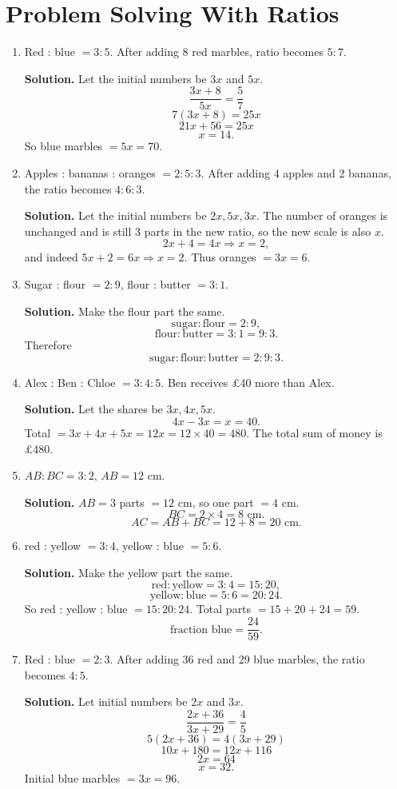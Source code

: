 \documentclass[12pt,a4paper]{article}
\begin{document}
\section*{Problem Solving With Ratios}
\begin{enumerate}
\item Red : blue \(=3:5\). After adding 8 red marbles, ratio becomes \(5:7\).

\textbf{Solution.} Let the initial numbers be \(3x\) and \(5x\).
\[
\frac{3x+8}{5x}=\frac{5}{7}
\]
\[
7(3x+8)=25x
\]
\[
21x+56=25x
\]
\[
x=14.
\]
So blue marbles \(=5x=70\).

\item Apples : bananas : oranges \(=2:5:3\). After adding 4 apples and 2 bananas, the ratio becomes \(4:6:3\).

\textbf{Solution.} Let the initial numbers be \(2x,5x,3x\). The number of oranges is unchanged and is still 3 parts in the new ratio, so the new scale is also \(x\).
\[
2x+4=4x \Rightarrow x=2,
\]
and indeed \(5x+2=6x\Rightarrow x=2\). Thus oranges \(=3x=6\).

\item Sugar : flour \(=2:9\), flour : butter \(=3:1\).

\textbf{Solution.} Make the flour part the same.
\[
\text{sugar}:\text{flour}=2:9,
\]
\[
\text{flour}:\text{butter}=3:1=9:3.
\]
Therefore
\[
\text{sugar}:\text{flour}:\text{butter}=2:9:3.
\]

\item Alex : Ben : Chloe \(=3:4:5\). Ben receives \pounds40 more than Alex.

\textbf{Solution.} Let the shares be \(3x,4x,5x\).
\[
4x-3x=x=40.
\]
Total \(=3x+4x+5x=12x=12\times40=480\).
The total sum of money is \pounds480.

\item \(AB:BC=3:2\), \(AB=12\) cm.

\textbf{Solution.} \(AB=3\) parts \(=12\) cm, so one part \(=4\) cm.
\[
BC=2\times4=8\text{ cm}.
\]
\[
AC=AB+BC=12+8=20\text{ cm}.
\]

\item red : yellow \(=3:4\), yellow : blue \(=5:6\).

\textbf{Solution.} Make the yellow part the same.
\[
\text{red}:\text{yellow}=3:4=15:20,
\]
\[
\text{yellow}:\text{blue}=5:6=20:24.
\]
So red : yellow : blue \(=15:20:24\). Total parts \(=15+20+24=59\).
\[
\text{fraction blue}=\frac{24}{59}.
\]

\item Red : blue \(=2:3\). After adding 36 red and 29 blue marbles, the ratio becomes \(4:5\).

\textbf{Solution.} Let initial numbers be \(2x\) and \(3x\).
\[
\frac{2x+36}{3x+29}=\frac45
\]
\[
5(2x+36)=4(3x+29)
\]
\[
10x+180=12x+116
\]
\[
2x=64
\]
\[
x=32.
\]
Initial blue marbles \(=3x=96\).
\end{enumerate}
\end{document}
